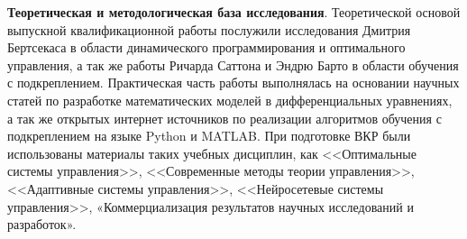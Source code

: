 \textbf{Теоретическая и методологическая база исследования}. Теоретической основой выпускной квалификационной работы послужили исследования Дмитрия Бертсекаса в области динамического программирования и оптимального управления, а так же работы Ричарда Саттона и Эндрю Барто в области обучения с подкреплением.
Практическая часть работы выполнялась на основании научных статей по разработке математических моделей в дифференциальных уравнениях, а так же открытых интернет источников по реализации алгоритмов обучения с подкреплением на языке Python и MATLAB.
При подготовке ВКР были использованы материалы таких учебных дисциплин, как <<Оптимальные системы управления>>, <<Современные методы теории управления>>, <<Адаптивные системы управления>>, <<Нейросетевые системы управления>>, «Коммерциализация результатов научных исследований и разработок».



